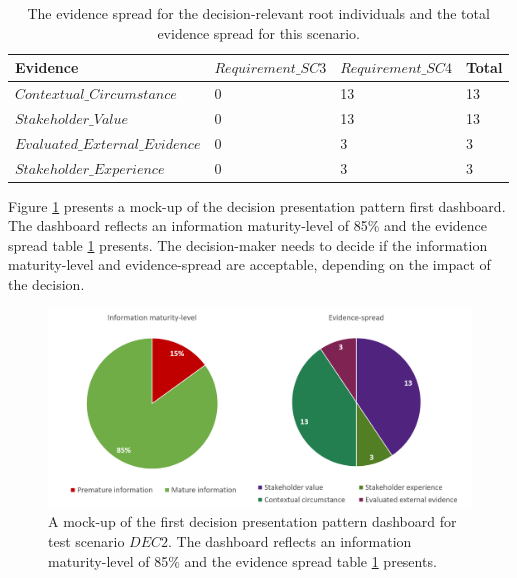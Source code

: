 \begin{table}[H]
\centering
\caption{The evidence spread for the decision-relevant root individuals and the total evidence spread for this scenario.}
\begin{tabular}{| p{5cm} | p{4cm} |  p{4cm} |  p{2cm} | }
\hline
\rowcolor{document}
\color{documentText}Evidence &\color{documentText}$Requirement\_SC3$ & \color{documentText}$Requirement\_SC4$ & \color{documentText}Total \\
\hline
$Contextual\_Circumstance$ & 0 & 13 & 13 \\
\hdashline
$Stakeholder\_Value$ & 0 & 13 & 13 \\
\hdashline
$Evaluated\_External\_Evidence$ & 0 & 3 & 3 \\
\hdashline
$Stakeholder\_Experience$ & 0 & 3 & 3 \\
\hline
\end{tabular}
\label{table:rp_evidence_spread_SC2}
\end{table}

Figure \ref{fig:05_RP_Dashboard_Component_1_RP_SC2} presents a mock-up of the decision presentation pattern first dashboard. The dashboard reflects an information maturity-level of 85\% and the evidence spread table \ref{table:rp_evidence_spread_SC2} presents. The decision-maker needs to decide if the information maturity-level and evidence-spread are acceptable, depending on the impact of the decision.

\begin{figure}[H]
\centering
  \includegraphics[width=14cm]{../../Images/05_Validation/05_RP_Dashboard_Component_1_RP_SC2.png}
  \caption{A mock-up of the first decision presentation pattern dashboard for test scenario $DEC2$. The dashboard reflects an information maturity-level of 85\% and the evidence spread table \ref{table:rp_evidence_spread_SC2} presents.}
  \label{fig:05_RP_Dashboard_Component_1_RP_SC2}
\end{figure}

